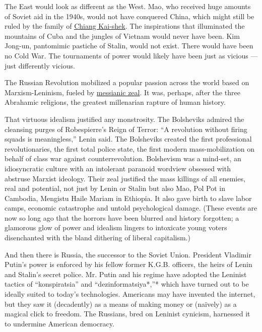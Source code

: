 The East would look as different as the West. Mao, who received huge
amounts of Soviet aid in the 1940s, would not have conquered China,
which might still be ruled by the family of
\href{https://www.nytimes.com/topic/person/chiang-kaishek}{Chiang
Kai-shek}. The inspirations that illuminated the mountains of Cuba and
the jungles of Vietnam would never have been. Kim Jong-un, pantomimic
pastiche of Stalin, would not exist. There would have been no Cold War.
The tournaments of power would likely have been just as vicious --- just
differently vicious.

The Russian Revolution mobilized a popular passion across the world
based on Marxism-Leninism, fueled by
\href{https://www.ft.com/content/21eccc8e-7d35-11e7-ab01-a13271d1ee9c}{messianic
zeal}. It was, perhaps, after the three Abrahamic religions, the
greatest millenarian rapture of human history.

That virtuous idealism justified any monstrosity. The Bolsheviks admired
the cleansing purges of Robespierre's Reign of Terror: ``A revolution
without firing squads is meaningless,'' Lenin said. The Bolsheviks
created the first professional revolutionaries, the first total police
state, the first modern mass-mobilization on behalf of class war against
counterrevolution. Bolshevism was a mind-set, an idiosyncratic culture
with an intolerant paranoid wordview obsessed with abstruse Marxist
ideology. Their zeal justified the mass killings of all enemies, real
and potential, not just by Lenin or Stalin but also Mao, Pol Pot in
Cambodia, Mengistu Haile Mariam in Ethiopia. It also gave birth to slave
labor camps, economic catastrophe and untold psychological damage.
(These events are now so long ago that the horrors have been blurred and
history forgotten; a glamorous glow of power and idealism lingers to
intoxicate young voters disenchanted with the bland dithering of liberal
capitalism.)

And then there is Russia, the successor to the Soviet Union. President
Vladimir Putin's power is enforced by his fellow former K.G.B. officers,
the heirs of Lenin and Stalin's secret police. Mr. Putin and his regime
have adopted the Leninist tactics of ``konspiratsia'' and
``dezinformatsiya*,''* which have turned out to be ideally suited to
today's technologies. Americans may have invented the internet, but they
saw it (decadently) as a means of making money or (naïvely) as a magical
click to freedom. The Russians, bred on Leninist cynicism, harnessed it
to undermine American democracy.

